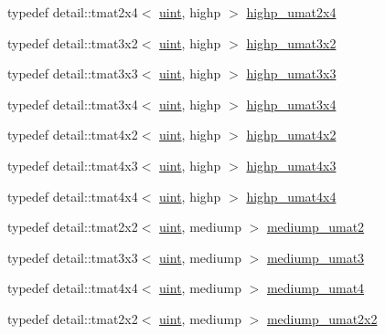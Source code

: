 \begin{CompactItemize}
\item 
typedef detail::tmat2x4$<$ \hyperlink{group__core__precision_g4fd29415871152bfb5abd588334147c8}{uint}, highp $>$ \hyperlink{group__gtc__matrix__integer_gbe8572c228aecc0bfa7ba92415b1c651}{highp\_\-umat2x4}
\item 
typedef detail::tmat3x2$<$ \hyperlink{group__core__precision_g4fd29415871152bfb5abd588334147c8}{uint}, highp $>$ \hyperlink{group__gtc__matrix__integer_g6f6a73ec605a515fb21d779663082ef9}{highp\_\-umat3x2}
\item 
typedef detail::tmat3x3$<$ \hyperlink{group__core__precision_g4fd29415871152bfb5abd588334147c8}{uint}, highp $>$ \hyperlink{group__gtc__matrix__integer_g8dd9f8bfe06de34c8f1a942d2c2e094c}{highp\_\-umat3x3}
\item 
typedef detail::tmat3x4$<$ \hyperlink{group__core__precision_g4fd29415871152bfb5abd588334147c8}{uint}, highp $>$ \hyperlink{group__gtc__matrix__integer_gbaeb2363acd07cc7f99918bae48ccc05}{highp\_\-umat3x4}
\item 
typedef detail::tmat4x2$<$ \hyperlink{group__core__precision_g4fd29415871152bfb5abd588334147c8}{uint}, highp $>$ \hyperlink{group__gtc__matrix__integer_g32442efcb778cb80024a17bafa781f81}{highp\_\-umat4x2}
\item 
typedef detail::tmat4x3$<$ \hyperlink{group__core__precision_g4fd29415871152bfb5abd588334147c8}{uint}, highp $>$ \hyperlink{group__gtc__matrix__integer_g763a36c57b6073ca3cac739bfbe794ba}{highp\_\-umat4x3}
\item 
typedef detail::tmat4x4$<$ \hyperlink{group__core__precision_g4fd29415871152bfb5abd588334147c8}{uint}, highp $>$ \hyperlink{group__gtc__matrix__integer_ga14b7029cfaf6f26384782f5ff7acddf}{highp\_\-umat4x4}
\item 
typedef detail::tmat2x2$<$ \hyperlink{group__core__precision_g4fd29415871152bfb5abd588334147c8}{uint}, mediump $>$ \hyperlink{group__gtc__matrix__integer_g388a5b9d7e494d5f5bd30b9e11ded06a}{mediump\_\-umat2}
\item 
typedef detail::tmat3x3$<$ \hyperlink{group__core__precision_g4fd29415871152bfb5abd588334147c8}{uint}, mediump $>$ \hyperlink{group__gtc__matrix__integer_g123f7d8bac8849e3a150bdf8a21e44a2}{mediump\_\-umat3}
\item 
typedef detail::tmat4x4$<$ \hyperlink{group__core__precision_g4fd29415871152bfb5abd588334147c8}{uint}, mediump $>$ \hyperlink{group__gtc__matrix__integer_gc82f1c426fbca1c4989f0985eb7a4358}{mediump\_\-umat4}
\item 
typedef detail::tmat2x2$<$ \hyperlink{group__core__precision_g4fd29415871152bfb5abd588334147c8}{uint}, mediump $>$ \hyperlink{group__gtc__matrix__integer_g80e478f09c6caa16410198ce78fe8a2b}{mediump\_\-umat2x2}

\end{CompactItemize}
